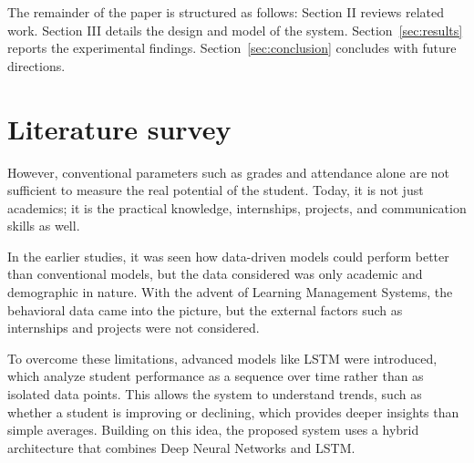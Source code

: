 \documentclass[conference]{IEEEtran}
\begin{document}
The remainder of the paper is structured as follows:
Section II reviews related work. Section III details the design and model of the system. Section~\ref{sec:results} reports the experimental findings. Section~\ref{sec:conclusion} concludes with future directions.


\section{Literature survey}
However, conventional parameters such as grades and attendance alone are not sufficient to measure the real potential of the student. Today, it is not just academics; it is the practical knowledge, internships, projects, and communication skills as well. 

In the earlier studies, it was seen how data-driven models could perform better than conventional models, but the data considered was only academic and demographic in nature. With the advent of Learning Management Systems, the behavioral data came into the picture, but the external factors such as internships and projects were not considered.

To overcome these limitations, advanced models like LSTM were introduced, which analyze student performance as a sequence over time rather than as isolated data points. This allows the system to understand trends, such as whether a student is improving or declining, which provides deeper insights than simple averages. Building on this idea, the proposed system uses a hybrid architecture that combines Deep Neural Networks and LSTM. 
\end{document}
